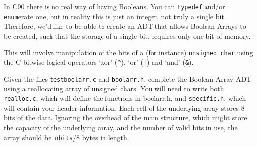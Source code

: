 
In C90 there is no real way of having Booleans.
You can \verb^typedef^ and/or \verb^enum^erate one, but in reality this is
just an integer, not truly a single bit.
Therefore, we'd like to be able to create an ADT that allows Boolean Arrays
to be created, such that the storage of a single bit, requires only one bit of memory.

\noindent
This will involve manipulation of the bits of a (for instance) \verb^unsigned char^
using the C bitwise logical operators `xor' (\verb#^#), `or' (\verb^|^) and `and' (\verb^&^).

\begin{exercise}
Given the files \verb^testboolarr.c^ and \verb^boolarr.h^, complete the Boolean Array ADT using
a reallocating array of unsigned chars. You will need to write both \verb^realloc.c^, which will define the 
functions in boolarr.h, and \verb^specific.h^, which will contain your header information. 
Each cell of the underlying array stores $8$ bits of the data. Ignoring the overhead of the main structure, 
which might store the capacity of the underlying array, and the number of valid bits in use, 
the array should be $~$\verb^nbits^$/8$ bytes in length.
\end{exercise}
